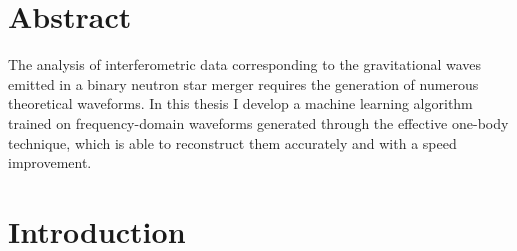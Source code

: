 \documentclass[main.tex]{subfiles}
\begin{document}


\vspace*{\fill}
\section*{Abstract}
The analysis of interferometric data corresponding to the gravitational waves emitted in a binary neutron star merger requires the generation of numerous theoretical waveforms.
In this thesis I develop a machine learning algorithm trained on frequency-domain waveforms generated through the effective one-body technique, which is able to reconstruct them accurately and with a speed improvement.
\vspace*{\fill}


\newpage

\tableofcontents




\newpage

\section*{Introduction}
\end{document}
